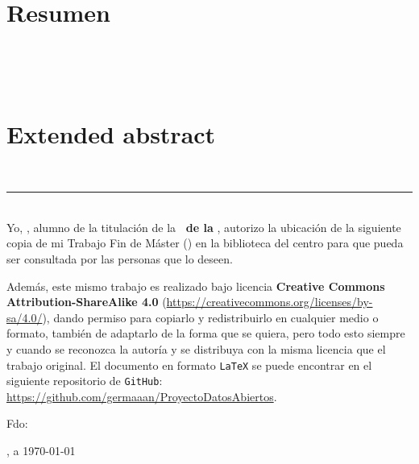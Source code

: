 \begin{center}
{\LARGE\bfseries\titulo}\\
\end{center}
\begin{center}
\autor\
\end{center}

\section*{Resumen}

\newpage
\begin{center}
{\LARGE\bfseries\tituloEng}\\
\end{center}
\begin{center}
\autor\
\end{center}

\section*{Extended abstract}

\newpage
\thispagestyle{empty}
\
\vspace{3cm}

\noindent\rule[-1ex]{\textwidth}{2pt}\\[4.5ex]

Yo, \textbf{\autor}, alumno de la titulación \textbf{\master} de la \textbf{\escuela\ de la \universidad}, autorizo la ubicación de la siguiente copia de mi Trabajo Fin de Máster (\textit{\titulo}) en la biblioteca del centro para que pueda ser consultada por las personas que lo deseen.

\bigskip
Además, este mismo trabajo es realizado bajo licencia \textbf{Creative Commons Attribution-ShareAlike 4.0} (\url{https://creativecommons.org/licenses/by-sa/4.0/}), dando permiso para copiarlo y redistribuirlo en cualquier medio o formato, también de adaptarlo de la forma que se quiera, pero todo esto siempre y cuando se reconozca la autoría y se distribuya con la misma licencia que el trabajo original. El documento en formato {\tt LaTeX} se puede encontrar en el siguiente repositorio de {\tt GitHub}: \url{https://github.com/germaaan/ProyectoDatosAbiertos}.

\vspace{4cm}

\noindent Fdo: \autor

\vspace{2cm}

\begin{flushright}
\ciudad, a \today
\end{flushright}

